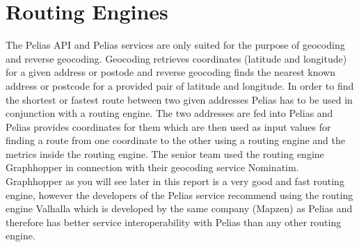 
\section{Routing Engines}
The Pelias API and Pelias services are only suited for the purpose of geocoding and reverse geocoding. Geocoding retrieves coordinates (latitude and longitude) for a given address or postode and reverse geocoding finds the nearest known address or postcode for a provided pair of latitude and longitude.
In order to find the shortest or fastest route between two given addresses Pelias has to be used in conjunction with a routing engine. The two addresses are fed into Pelias and Pelias provides coordinates for them which are then used as input values for finding a route from one coordinate to the other using a routing engine and the metrics inside the routing engine.
The senior team used the routing engine Graphhopper in connection with their geocoding service Nominatim. Graphhopper as you will see later in this report is a very good and fast routing engine, however the developers of the Pelias service recommend using the routing engine Valhalla which is developed by the same company (Mapzen) as Pelias and therefore has better service interoperability with Pelias than any other routing engine.

